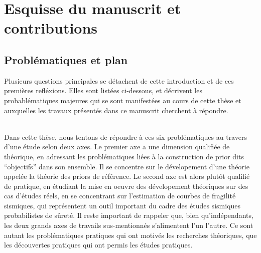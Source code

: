 \section{Esquisse du manuscrit et contributions}

\subsection{Problématiques et plan}



Plusieurs questions principales se détachent de cette introduction et de ces premières refléxions. Elles sont listées ci-dessous, et décrivent les probablématiques majeures qui se sont manifestées au cours de cette thèse et auxquelles les travaux présentés dans ce manuscrit cherchent à répondre.







\\


Dans cette thèse, nous tentons de répondre à ces six problématiques au travers d'une étude selon deux axes. Le premier axe a une dimension qualifiée de théorique, en adressant les problématiques liées à la construction de prior dits ``objectifs'' dans son ensemble. Il se concentre sur le dévelopement d'une théorie appelée la théorie des priors de référence. Le second axe est alors plutôt qualifié de pratique, en étudiant la mise en oeuvre des dévelopement théoriques sur des cas d'études réels, en se concentrant sur l'estimation de courbes de fragilité sismiques, qui représentent un outil important du cadre des études sismiques probabilistes de sûreté.
Il reste important de rappeler que, bien qu'indépendants, les deux grands axes de travails sus-mentionnés s'alimentent l'un l'autre. Ce sont autant les problématiques pratiques qui ont motivés les recherches théoriques, que les découvertes pratiques qui ont permis les études pratiques.\\


